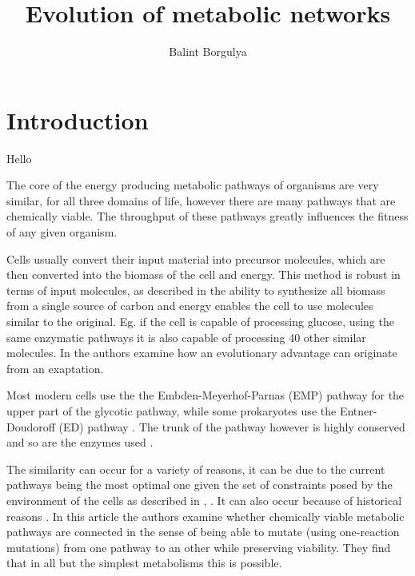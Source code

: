 \documentclass[10pt,a4paper]{article}
\title{Evolution of metabolic networks}
\author{Balint Borgulya}
\begin{document}
	
	
	
	\maketitle
	
	\begin{abstract}
		
	\end{abstract}
	
	\section{Introduction}
	Hello \cite{BartekLower}
	
	
	The core of the energy producing metabolic pathways of organisms are very similar, for all three domains of life, however there are many pathways that are chemically viable.  The throughput of these pathways greatly influences the fitness of any given organism. 
	
	Cells usually convert their input material into precursor molecules, which are then converted into the biomass of the cell and energy. This method is robust in terms of input molecules, as described in \cite{latent} the ability to synthesize all biomass from a single source of carbon and energy enables the cell to use molecules similar to the original. Eg. if the cell is capable of processing glucose, using the same enzymatic pathways it is also capable of processing 40 other similar molecules.  In \cite{latent} the authors examine how an evolutionary advantage can originate from an exaptation. 
	
	  
	Most modern cells use the the Embden-Meyerhof-Parnas (EMP) pathway for the upper part of the glycotic  pathway, while some prokaryotes use the Entner-Doudoroff (ED) pathway \cite{EDpathway}. The trunk of the pathway however is highly conserved and so are the enzymes used \cite{latent}. 
	
	The similarity can occur for a variety of reasons, it can be due to the current pathways being the most optimal one given the set of constraints posed by the environment of the cells as described in \cite{theoretical}, \cite{central}. It can also occur because of historical reasons \cite{historical}. In this article the authors examine whether chemically viable metabolic pathways are connected in the sense of being able to mutate (using one-reaction mutations) from one pathway to an other while preserving viability. They find that in all but the simplest metabolisms this is possible.
	
\end{document}
